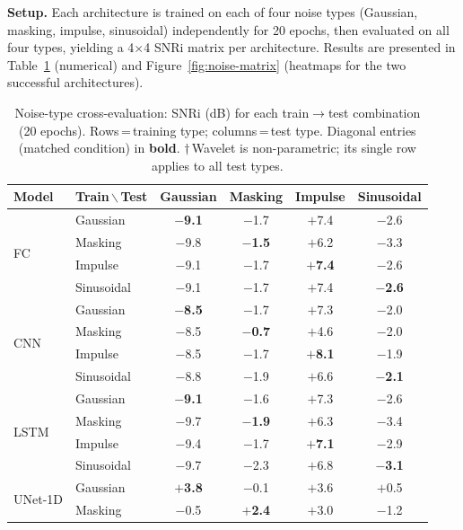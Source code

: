 \documentclass{article}
\begin{document}
\textbf{Setup.}
Each architecture is trained on each of four noise types (Gaussian, masking,
impulse, sinusoidal) independently for 20 epochs, then evaluated on all four
types, yielding a 4$\times$4 SNRi matrix per architecture.
Results are presented in Table~\ref{tab:noise-types} (numerical) and
Figure~\ref{fig:noise-matrix} (heatmaps for the two successful architectures).

\begin{table}[ht]
\caption{Noise-type cross-evaluation: SNRi (dB) for each train$\to$test
combination (20 epochs). Rows\,=\,training type; columns\,=\,test type.
Diagonal entries (matched condition) in \textbf{bold}.
$\dagger$\,Wavelet is non-parametric; its single row applies to all test types.}
\label{tab:noise-types}
\begin{center}
\small
\setlength{\tabcolsep}{5pt}
\begin{tabular}{ll|cccc}
\toprule
\textbf{Model} & \textbf{Train\,$\backslash$\,Test} & Gaussian & Masking & Impulse & Sinusoidal \\
\midrule
\multirow{4}{*}{FC}
  & Gaussian   & \textbf{$-$9.1} & $-$1.7 & $+$7.4 & $-$2.6 \\
  & Masking    & $-$9.8 & \textbf{$-$1.5} & $+$6.2 & $-$3.3 \\
  & Impulse    & $-$9.1 & $-$1.7 & \textbf{$+$7.4} & $-$2.6 \\
  & Sinusoidal & $-$9.1 & $-$1.7 & $+$7.4 & \textbf{$-$2.6} \\
\midrule
\multirow{4}{*}{CNN}
  & Gaussian   & \textbf{$-$8.5} & $-$1.7 & $+$7.3 & $-$2.0 \\
  & Masking    & $-$8.5 & \textbf{$-$0.7} & $+$4.6 & $-$2.0 \\
  & Impulse    & $-$8.5 & $-$1.7 & \textbf{$+$8.1} & $-$1.9 \\
  & Sinusoidal & $-$8.8 & $-$1.9 & $+$6.6 & \textbf{$-$2.1} \\
\midrule
\multirow{4}{*}{LSTM}
  & Gaussian   & \textbf{$-$9.1} & $-$1.6 & $+$7.3 & $-$2.6 \\
  & Masking    & $-$9.7 & \textbf{$-$1.9} & $+$6.3 & $-$3.4 \\
  & Impulse    & $-$9.4 & $-$1.7 & \textbf{$+$7.1} & $-$2.9 \\
  & Sinusoidal & $-$9.7 & $-$2.3 & $+$6.8 & \textbf{$-$3.1} \\
\midrule
\multirow{4}{*}{UNet-1D}
  & Gaussian   & \textbf{$+$3.8} & $-$0.1 & $+$3.6 & $+$0.5 \\
  & Masking    & $-$0.5 & \textbf{$+$2.4} & $+$3.0 & $-$1.2 \\

\end{tabular}
\end{center}
\end{table}
\end{document}
